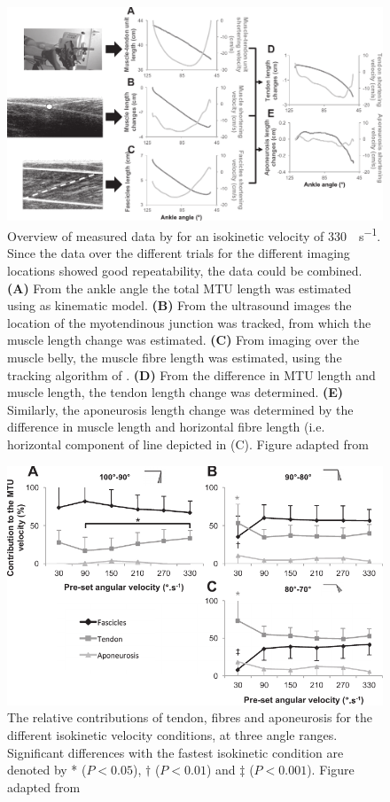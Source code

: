 \begin{figure}[t]
	\centering
	\includegraphics[width=\linewidth]{Figures/mtu_imaging/hauraix_2013_mtu_velocity.pdf}
	\caption{Overview of measured data by \citeauthor{hauraix_shortening_2013} for an isokinetic velocity of \SI{330}{\deg\per\second}. Since the data over the different trials for the different imaging locations showed good repeatability, the data could be combined. \textbf{(A)} From the ankle angle the total MTU length was estimated using as kinematic model. \textbf{(B)} From the ultrasound images the location of the myotendinous junction was tracked, from which the muscle length change was estimated. \textbf{(C)} From imaging over the muscle belly, the muscle fibre length was estimated, using the tracking algorithm of \citet{cronin_automatic_2011}. \textbf{(D)} From the difference in MTU length and muscle length, the tendon length change was determined. \textbf{(E)} Similarly, the aponeurosis length change was determined by the difference in muscle length and horizontal fibre length (i.e. horizontal component of line depicted in (C). Figure adapted from \citet{hauraix_shortening_2013}}
	\label{fig:hauraix_2013}
\end{figure}

\begin{figure}[t]
	\centering
	\includegraphics[width=.8\linewidth]{Figures/mtu_imaging/hauraix_2013_mtu_contrib.pdf}
	\caption{The relative contributions of tendon, fibres and aponeurosis for the different isokinetic velocity conditions, at three angle ranges. Significant differences with the fastest isokinetic condition are denoted by * ($P<0.05$), $\dag$ ($P<0.01$) and $\ddag$ ($P<0.001$). Figure adapted from \citet{hauraix_shortening_2013}}
	\label{fig:hauraix_2013_contrib}
\end{figure}





